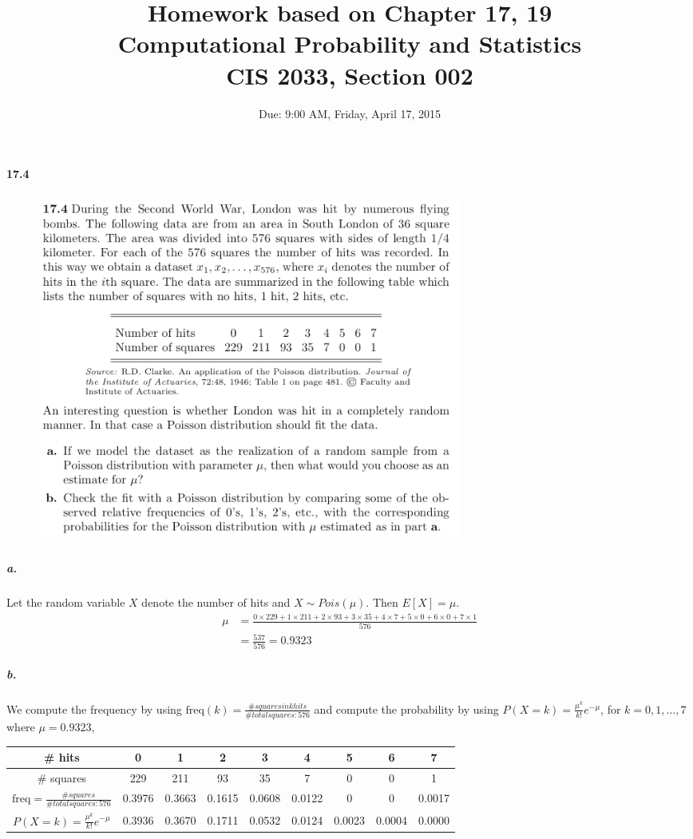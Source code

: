 \documentclass{article} %
\title{Homework based on Chapter 17, 19\\
Computational Probability and Statistics \\
CIS 2033, Section 002}
\author{Due: 9:00 AM, Friday, April 17, 2015}
\begin{document}
\maketitle

\paragraph*{17.4} 
\begin{figure}[h!]
\centering
\includegraphics[width=5.5in, height=4.5in]{1.png}
\end{figure}

\subparagraph*{a.} Let the random variable $X$ denote the number of hits and $X \sim Pois(\mu)$. Then $E[X] = \mu$. 
\begin{align*}
\mu & = \frac{0\times 229 + 1\times 211 + 2\times 93 + 3 \times 35 + 4 \times 7 + 5 \times 0 + 6\times 0 + 7\times 1}{576}\\
& = \frac{537}{576} = 0.9323
\end{align*}

\subparagraph*{b.} 
We compute the frequency by using $\text{freq}(k)=\frac{\#squares in k hits}{\#total squares:576}$ and compute the probability by using $P(X=k) = \frac{\mu^k}{k!}e^{-\mu}$, for $k=0,1, \ldots, 7$ where $\mu =0.9323$, 
\begin{table}[h!]
\centering
\begin{tabular}{ccccccccc} \\ \hline \hline 
\# hits & 0 & 1 & 2 & 3 & 4 & 5 & 6 & 7 \\ \hline
\# squares & 229 & 211 & 93 & 35 & 7 & 0 & 0 & 1 \\ \hline
$\text{freq}=\frac{\#squares}{\#total squares:576}$ &
0.3976 & 0.3663  &   0.1615   &  0.0608  &   0.0122    &     0    &     0  &  0.0017\\
$P(X=k) = \frac{\mu^k}{k!}e^{-\mu}$ & 
 0.3936  &  0.3670  &  0.1711  &  0.0532 &   0.0124  &  0.0023  &  0.0004 &   0.0000 \\
\hline \hline
\end{tabular}
\end{table}
\end{document}
